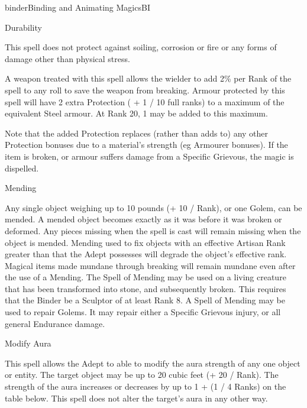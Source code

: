 \begin{College}[1.2]{binder}{Binding and Animating Magics}{BI}
\begin{spell}[G-4]{Durability}
\begin{effects}
This spell does not protect against soiling, corrosion or fire or any
forms of damage other than physical stress.

A weapon treated with this spell allows the wielder to add 2\% per
Rank of the spell to any roll to save the weapon from breaking.
Armour protected by this spell will have 2 extra Protection ( + 1 / 10
full ranks) to a maximum of the equivalent Steel armour.  At Rank 20,
1 may be added to this maximum.

Note that the added Protection replaces (rather than adds to) any
other Protection bonuses due to a material’s strength (eg Armourer
bonuses).  If the item is broken, or armour suffers damage from a
Specific Grievous, the magic is dispelled.
\end{effects}
\end{spell}

\begin{spell}[G-5]{Mending}

\begin{effects}
Any single object weighing up to 10 pounds (+ 10 / Rank), or one
Golem, can be mended.  A mended object becomes exactly as it was
before it was broken or deformed. Any pieces missing when the spell is
cast will remain missing when the object is mended.  Mending used to
fix objects with an effective Artisan Rank greater than that the Adept
possesses will degrade the object’s effective rank.  Magical items
made mundane through breaking will remain mundane even after the use
of a Mending.  The Spell of Mending may be used on a living creature
that has been transformed into stone, and subsequently broken.  This
requires that the Binder be a Sculptor of at least Rank 8.  A Spell of
Mending may be used to repair Golems.  It may repair either a Specific
Grievous injury, or all general Endurance damage.
\end{effects}
\end{spell}

\begin{spell}[G-6]{Modify Aura}

\begin{effects}
This spell allows the Adept to able to modify the aura strength of any
one object or entity. The target object may be up to 20 cubic feet (+
20 / Rank).  The strength of the aura increases or decreases by up to
1 + (1 / 4 Ranks) on the table below. This spell does not alter the
target’s aura in any other way.


\end{effects}
\end{spell}
\end{College}
